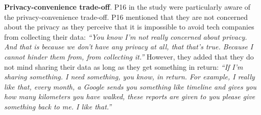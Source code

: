     

        
        \textbf{Privacy-convenience trade-off}.
        P16 in the study were particularly aware of the privacy-convenience trade-off.
        P16 mentioned that they are not concerned about the privacy as they perceive that it is impossible to avoid tech companies from collecting their data:
        \textit{``You know I'm not really concerned about privacy. And that is because we don't have any privacy at all, that that's true. Because I cannot hinder them from, from collecting it.''}
        However, they added that they do not mind sharing their data as long as they get something in return:
        \textit{``If I'm sharing something. I need something, you know, in return. For example, I really like that, every month, a Google sends you something like timeline and gives you how many kilometers you have walked, these reports are given to you please give something back to me. I like that.''}
        
